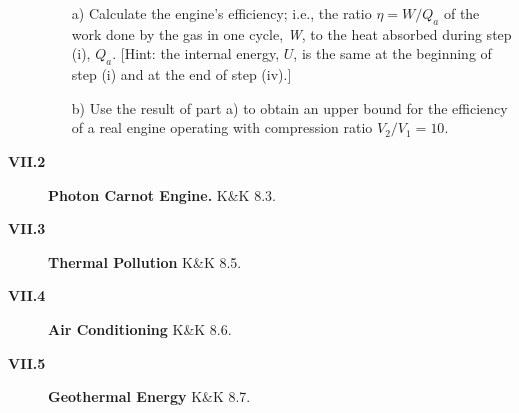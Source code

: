 \documentclass[11pt]{article}
\begin{document}
\begin{description}
\begin{itemize}
\item[a)] 
Calculate the engine's efficiency; i.e.,
the ratio ${\eta} = {W}/{Q}_{a}$  
of the work done by the gas in one cycle, 
{\it W}, to the heat absorbed 
during step (i), ${Q}_{a}$. 
[Hint:  the internal energy, ${U}$,
is the same at the beginning of step (i) 
and at the end of step (iv).]
\item[b)] 
Use the result of part a) to obtain an upper bound for
the efficiency of a real engine operating with
compression ratio $V_2/V_1 = 10$.
\end{itemize}

\item[{\bf VII.2} ] {\bf Photon Carnot Engine.} K\&K 8.3.

\item[{\bf VII.3} ] {\bf Thermal Pollution} K\&K 8.5.

\item[{\bf VII.4} ] {\bf Air Conditioning} K\&K 8.6.

\item[{\bf VII.5} ] {\bf Geothermal Energy} K\&K 8.7.


\end{description}
\end{document}
